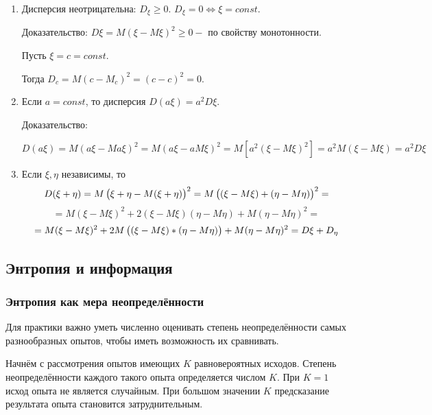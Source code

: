 ﻿\documentclass[a4paper,12pt]{report}
\begin{document}
	\begin{enumerate}

	\item	Дисперсия неотрицательна: $D_\xi \ge 0.$ $D_\xi = 0 \Longleftrightarrow \xi = const$. 
		
		Доказательство: $D\xi = M(\xi-M\xi)^2 \ge 0 - $ по свойству монотонности.
		
		Пусть $\xi = c = const$.
		
		Тогда $D_c = M(c-M_c)^2 =(c - c)^2 = 0$.


	\item	Если $a = const$, то дисперсия $D(a\xi) = a^2 D\xi$. 
	
		Доказательство: 
		
		$D(a\xi) = M(a\xi - Ma\xi)^2
		         = M(a\xi - a M\xi)^2
		         = M[a^2 (\xi-M\xi)^2]
		         = a^2 M(\xi - M\xi)
		         = a^2 D\xi
		$
		

	\item	Если $\xi,\eta$ независимы, то 
		$$
		  D(\xi + \eta) = M\left(  \xi \strut + \eta - M(\xi +\eta)    \right)^2 
		                = M\left( (\xi - M\xi) \strut + (\eta - M\eta) \right)^2
		                =
		$$ $$		                
		                = M(\xi - M\xi)^2 + 2(\xi-M\xi)(\eta - M\eta) + M(\eta - M\eta)^2
		                =
		$$ $$
		                = M(\xi - M\xi)^2 + 2M\left( (\xi - M\xi) \strut * (\eta - M\eta)\right) 
		                  + M(\eta - M\eta)^2
		                = D\xi + D_\eta
		$$
	
	\end{enumerate}
	
	
	
	

\subsection{Энтропия и информация}

\subsubsection{Энтропия как мера неопределённости}

	Для практики важно уметь численно оценивать степень неопределённости самых разнообразных опытов, чтобы иметь возможность их сравнивать. 
	
	Начнём с рассмотрения опытов имеющих $K$ равновероятных исходов. Степень неопределённости каждого такого опыта определяется числом $K$. При $K = 1$ исход опыта не является случайным. При большом значении $K$ предсказание результата опыта становится затруднительным.
	
\end{document}
